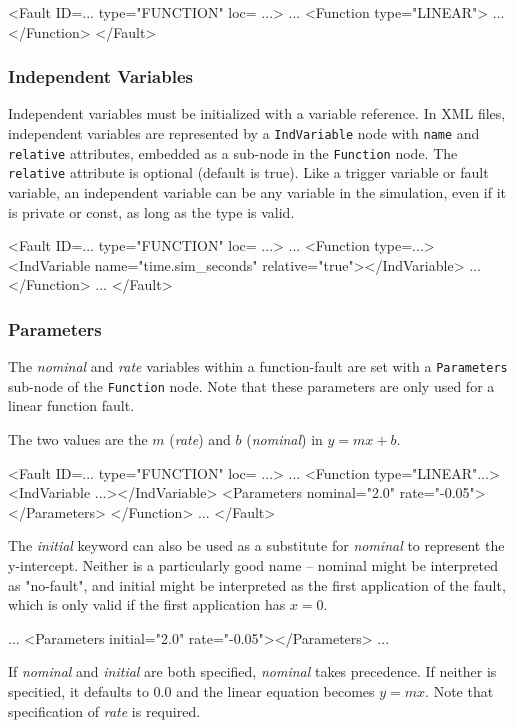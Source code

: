 \documentclass[11pt,fleqn]{report}
\begin{document}
\begin{codeXML}
  <Fault ID=... type="FUNCTION" loc= ...>
    ...
    <Function type="LINEAR">
    ...
    </Function>
  </Fault>
\end{codeXML}

\subsubsection{Independent Variables}
Independent variables must be initialized with a variable reference. In XML
files, independent variables are represented by a \verb"IndVariable" node with
\verb"name" and \verb"relative" attributes, embedded as a sub-node in the
\verb'Function' node.
The \verb"relative" attribute is optional (default is true).
Like a trigger variable or fault variable, an independent variable can be any
variable in the simulation, even if it is private or const, as long as the type
is valid.
\begin{codeXML}
  <Fault ID=... type="FUNCTION" loc= ...>
    ...
    <Function type=...>
      <IndVariable name="time.sim_seconds" relative="true"></IndVariable>
      ...
    </Function>
    ...
  </Fault>
\end{codeXML}

\subsubsection{Parameters}
The \textit{nominal} and \textit{rate} variables within a function-fault are
set with a \verb'Parameters' sub-node of the \verb'Function' node. Note that
these parameters are only used for a linear function fault.

The two values are the $m$ (\textit{rate}) and $b$ (\textit{nominal}) in
$y=mx+b$.


\begin{codeXML}
 <Fault ID=... type="FUNCTION" loc= ...>
    ...
    <Function type="LINEAR"...>
      <IndVariable ...></IndVariable>
      <Parameters nominal="2.0" rate="-0.05"></Parameters>
    </Function>
    ...
</Fault>
\end{codeXML}

The \textit{initial} keyword can also be used as a substitute for
\textit{nominal} to represent the y-intercept. Neither is a particularly good
name -- nominal might be interpreted as "no-fault", and initial might be
interpreted as the first application of the fault, which is only valid if the
first application has $x=0$.

\begin{codeXML}
      ...
      <Parameters initial="2.0" rate="-0.05"></Parameters>
      ...
\end{codeXML}
If \textit{nominal} and \textit{initial} are both specified, \textit{nominal}
takes precedence. If neither is specitied, it defaults to 0.0 and the linear
equation becomes $y=mx$. Note that specification of \textit{rate} is required.
\end{document}
